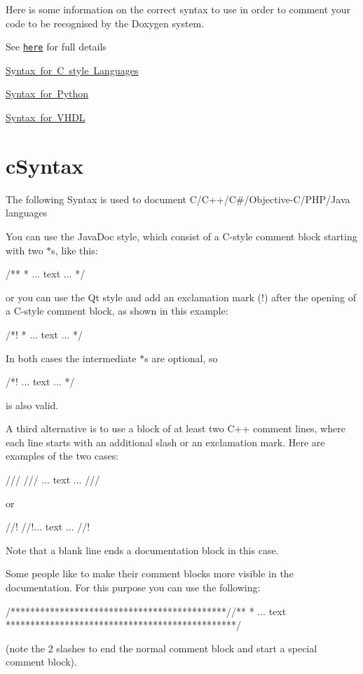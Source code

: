 Here is some information on the correct syntax to use in order to comment your code to be recognised by the Doxygen system.

See \href{http://www.stack.nl/~dimitri/doxygen/manual/docblocks.html}{\tt here} for full details


\begin{DoxyItemize}
\item \mbox{\hyperlink{c_syntax}{Syntax for C style Languages}}
\item \mbox{\hyperlink{python_syntax}{Syntax for Python}}
\item \mbox{\hyperlink{vhdl_syntax}{Syntax for V\+H\+DL}} 
\end{DoxyItemize}\hypertarget{cSyntax}{}\section{c\+Syntax}\label{cSyntax}
The following Syntax is used to document C/\+C++/C\#/\+Objective-\/\+C/\+P\+H\+P/\+Java languages

You can use the Java\+Doc style, which consist of a C-\/style comment block starting with two $\ast$\textquotesingle{}s, like this\+: 
\begin{DoxyCode}
/**
 * ... text ...
 */
\end{DoxyCode}
 or you can use the Qt style and add an exclamation mark (!) after the opening of a C-\/style comment block, as shown in this example\+: 
\begin{DoxyCode}
/*!
 * ... text ...
 */
\end{DoxyCode}
 In both cases the intermediate $\ast$\textquotesingle{}s are optional, so 
\begin{DoxyCode}
/*!
 ... text ...
*/
\end{DoxyCode}
 is also valid.

A third alternative is to use a block of at least two C++ comment lines, where each line starts with an additional slash or an exclamation mark. Here are examples of the two cases\+: 
\begin{DoxyCode}
///
/// ... text ...
///
\end{DoxyCode}
 or 
\begin{DoxyCode}
//!
//!... text ...
//!
\end{DoxyCode}
 Note that a blank line ends a documentation block in this case.

Some people like to make their comment blocks more visible in the documentation. For this purpose you can use the following\+: 
\begin{DoxyCode}
/********************************************//**
 *  ... text
 ***********************************************/
\end{DoxyCode}
 (note the 2 slashes to end the normal comment block and start a special comment block).

